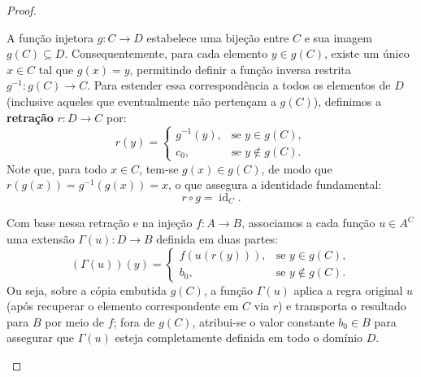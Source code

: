 \begin{proof}
\begin{enumerate}
              A função injetora \(g: C \to D\) estabelece uma bijeção entre \(C\) e sua imagem \(g(C) \subseteq D\). Consequentemente, para cada elemento \(y \in g(C)\), existe um único \(x \in C\) tal que \(g(x) = y\), permitindo definir a função inversa restrita \(g^{-1}: g(C) \to C\). Para estender essa correspondência a todos os elementos de \(D\) (inclusive aqueles que eventualmente não pertençam a \(g(C)\)), definimos a \textbf{retração} \(r: D \to C\) por:
              \[
                  r(y) =
                  \begin{cases}
                      g^{-1}(y), & \text{se } y \in g(C),    \\
                      c_0,       & \text{se } y \notin g(C).
                  \end{cases}
              \]
              Note que, para todo \(x \in C\), tem-se \(g(x) \in g(C)\), de modo que \(r(g(x)) = g^{-1}(g(x)) = x\), o que assegura a identidade fundamental:
              \[
                  r \circ g = \operatorname{id}_C.
              \]

              Com base nessa retração e na injeção \(f: A \to B\), associamos a cada função \(u \in A^C\) uma extensão \(\Gamma(u): D \to B\) definida em duas partes:
              \[
                  (\Gamma(u))(y) =
                  \begin{cases}
                      f(u(r(y))), & \text{se } y \in g(C),    \\
                      b_0,        & \text{se } y \notin g(C).
                  \end{cases}
              \]
              Ou seja, sobre a cópia embutida \(g(C)\), a função \(\Gamma(u)\) aplica a regra original \(u\) (após recuperar o elemento correspondente em \(C\) via \(r\)) e transporta o resultado para \(B\) por meio de \(f\); fora de \(g(C)\), atribui-se o valor constante \(b_0 \in B\) para assegurar que \(\Gamma(u)\) esteja completamente definida em todo o domínio \(D\).


\end{enumerate}
\end{proof}
